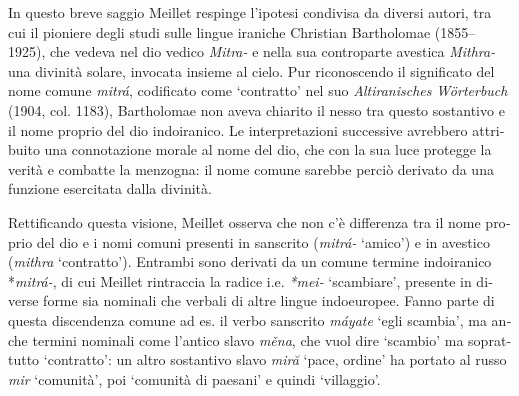 \documentclass[french,output=paper,colorlinks,citecolor=brown]{../langscibook}
\begin{document}
\begin{otherlanguage}{italian}
In questo breve saggio Meillet respinge l’ipotesi condivisa da diversi autori, tra cui il pioniere degli studi sulle lingue iraniche Christian Bartholomae (1855--1925), che vedeva nel dio vedico \textit{Mitra-} e nella sua controparte avestica \textit{Mithra-} una divinità solare, invocata insieme al cielo.\textbf{ }Pur riconoscendo il significato del nome comune \textit{mitrá}, codificato come ‘contratto’ nel suo \textit{Altiranisches} \textit{Wörterbuch} (1904, col. 1183), Bartholomae non aveva chiarito il nesso tra questo sostantivo e il nome proprio del dio indoiranico. Le interpretazioni successive avrebbero attribuito una connotazione morale al nome del dio, che con la sua luce protegge la verità e combatte la menzogna: il nome comune sarebbe perciò derivato da una funzione esercitata dalla divinità.\footnotemark{}

Rettificando questa visione, Meillet osserva che non c’è differenza tra il nome proprio del dio e i nomi comuni presenti in sanscrito (\textit{mitrá{}-} ‘amico’) e in avestico (\textit{mithra} ‘contratto’). Entrambi sono derivati da un comune termine indoiranico *\textit{mitrá-}, di cui Meillet rintraccia la radice i.e. \textit{*mei-} ‘scambiare’, presente in diverse forme sia nominali che verbali di altre lingue indoeuropee.\footnotemark{} Fanno parte di questa discendenza comune ad es. il verbo sanscrito \textit{máyate} ‘egli scambia’, ma anche termini nominali come l’antico slavo \textit{měna}, che vuol dire ‘scambio’ ma soprattutto ‘contratto’: un altro sostantivo slavo \textit{miră} ‘pace, ordine’ ha portato al russo \textit{mir} ‘comunità’, poi ‘comunità di paesani’ e quindi ‘villaggio’.



\end{otherlanguage}
\end{document}
